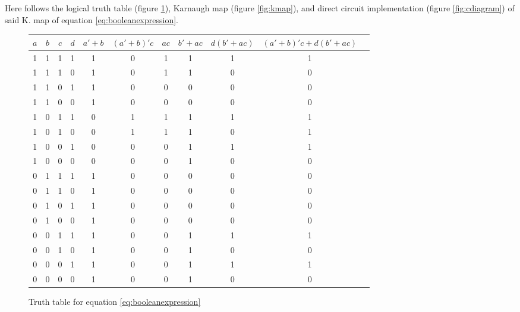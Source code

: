 \documentclass[11pt]{article}
\begin{document}
\begin{question}

	Here follows the logical truth table (figure \ref{fig:ttable}), Karnaugh map (figure \ref{fig:kmap}), and direct circuit
	implementation (figure \ref{fig:cdiagram}) of said K. map of equation \ref{eq:booleanexpression}.

	\begin{figure}[h]
		\begin{center}
			\begin{tabular} {c c c c | c c c c c c c}
				$a$ & $b$ & $c$ & $d$ & $a'+b$ & $(a'+b)'c$ & $ac$ & $b'+ac$ & $d(b'+ac)$ & $(a'+b)'c+d(b'+ac)$ \\
				\hline
				1 & 1 & 1 & 1 & 1 & 0 & 1 & 1 & 1 & 1 \\
				1 & 1 & 1 & 0 & 1 & 0 & 1 & 1 & 0 & 0 \\
				1 & 1 & 0 & 1 & 1 & 0 & 0 & 0 & 0 & 0 \\
				1 & 1 & 0 & 0 & 1 & 0 & 0 & 0 & 0 & 0 \\
				1 & 0 & 1 & 1 & 0 & 1 & 1 & 1 & 1 & 1 \\
				1 & 0 & 1 & 0 & 0 & 1 & 1 & 1 & 0 & 1 \\
				1 & 0 & 0 & 1 & 0 & 0 & 0 & 1 & 1 & 1 \\
				1 & 0 & 0 & 0 & 0 & 0 & 0 & 1 & 0 & 0 \\
				0 & 1 & 1 & 1 & 1 & 0 & 0 & 0 & 0 & 0 \\
				0 & 1 & 1 & 0 & 1 & 0 & 0 & 0 & 0 & 0 \\
				0 & 1 & 0 & 1 & 1 & 0 & 0 & 0 & 0 & 0 \\
				0 & 1 & 0 & 0 & 1 & 0 & 0 & 0 & 0 & 0 \\
				0 & 0 & 1 & 1 & 1 & 0 & 0 & 1 & 1 & 1 \\
				0 & 0 & 1 & 0 & 1 & 0 & 0 & 1 & 0 & 0 \\
				0 & 0 & 0 & 1 & 1 & 0 & 0 & 1 & 1 & 1 \\
				0 & 0 & 0 & 0 & 1 & 0 & 0 & 1 & 0 & 0 \\
			\end{tabular}
		\end{center}
		\caption{\label{fig:ttable} Truth table for equation \ref{eq:booleanexpression}}
	\end{figure}

	\begin{figure}[h]
		\begin{center}
\end{center}
\end{figure}
\end{question}
\end{document}
